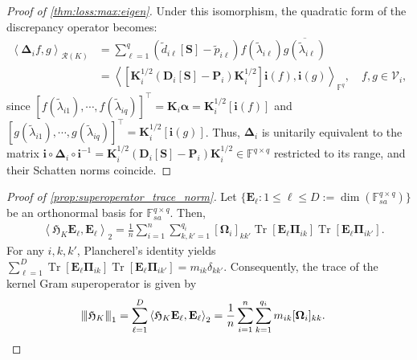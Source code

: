 \documentclass[noinfoline]{imsart}\setcounter{tocdepth}{2}
\renewcommand{\b}[1]{\mathbb{#1}} %
\newcommand{\m}[1]{\mathbf{#1}} %
\newcommand{\f}[1]{\mathfrak{#1}} %
\renewcommand{\c}[1]{\mathcal{#1}} %
\newcommand{\mb}[1]{\boldsymbol{#1}} %
\newcommand{\tr}[1]{\operatorname{Tr}\left[#1\right]}
\newcommand{\vertiii}[1]{{\left\vert\kern-0.25ex\left\vert\kern-0.25ex\left\vert #1 
    \right\vert\kern-0.25ex\right\vert\kern-0.25ex\right\vert}} %
\newcommand{\innpr}[2]{{\left\langle {#1},{#2}\right\rangle}} %
\theoremstyle{plain}
\begin{document}
\begin{appendix}
\begin{proof}[Proof of \cref{thm:loss:max:eigen}]
Under this isomorphism, the quadratic form of the discrepancy operator becomes:
\begin{align*}
    \innpr{\mb{\Delta}_{i} f}{g}_{\c{R}(K)} &= \sum_{\ell=1}^{q} (\tilde{d}_{i\ell}[\m{S}] - \tilde{p}_{i\ell}) f(\tilde{\lambda}_{i\ell}) \overline{g(\tilde{\lambda}_{i\ell})} \\
    &= \innpr{[\m{K}_{i}^{1/2} (\m{D}_{i}[\m{S}] - \m{P}_{i}) \m{K}_{i}^{1/2}] \m{i}(f)}{\m{i}(g)}_{\b{F}^{q}}, \quad f, g \in \c{V}_{i},
\end{align*}
since $[f(\tilde{\lambda}_{i1}), \cdots, f(\tilde{\lambda}_{iq})]^{\top} = \m{K}_{i} \mb{\alpha} = \m{K}_{i}^{1/2} [\m{i}(f)]$ and $[g(\tilde{\lambda}_{i1}), \cdots, g(\tilde{\lambda}_{iq})]^{\top} = \m{K}_{i}^{1/2} [\m{i}(g)]$.
Thus, $\mb{\Delta}_i$ is unitarily equivalent to the matrix $\m{i} \circ \mb{\Delta}_{i} \circ \m{i}^{-1} = \m{K}_{i}^{1/2} (\m{D}_{i}[\m{S}] - \m{P}_{i}) \m{K}_{i}^{1/2} \in \b{F}^{q \times q}$ restricted to its range, and their Schatten norms coincide.
\end{proof}


\begin{proof}[Proof of \cref{prop:superoperator_trace_norm}]
Let $\{\m{E}_{\ell} : 1 \le \ell \le D := \dim(\b{F}_{sa}^{q \times q})\}$ be an orthonormal basis for $\b{F}_{sa}^{q \times q}$. Then,
\begin{align*}
    &\innpr{\f{H}_{K} \m{E}_{\ell}}{\m{E}_{\ell}}_{2} = \frac{1}{n} \sum_{i=1}^{n} \sum_{k, k'=1}^{q_{i}} [\mb{\Omega}_i]_{kk'} \tr{\m{E}_{\ell} \m{\Pi}_{ik}} \tr{\m{E}_{\ell} \m{\Pi}_{ik'}}.
\end{align*}
For any $i, k, k'$, Plancherel's identity yields $\sum_{\ell=1}^{D} \tr{\m{E}_{\ell} \m{\Pi}_{ik}} \tr{\m{E}_{\ell} \m{\Pi}_{ik'}} = m_{ik} \delta_{kk'}$.
Consequently, the trace of the kernel Gram superoperator is given by
\begin{align*}
    \vertiii{\f{H}_{K}}_{1} &= 
    \sum_{\ell=1}^{D}
    \innpr{\f{H}_{K} \m{E}_{\ell}}{\m{E}_{\ell}}_{2} = \frac{1}{n} \sum_{i=1}^{n} \sum_{k=1}^{q_{i}} m_{ik} [\mb{\Omega}_i]_{kk} .
\end{align*}
\end{proof}



\end{appendix}
\end{document}
